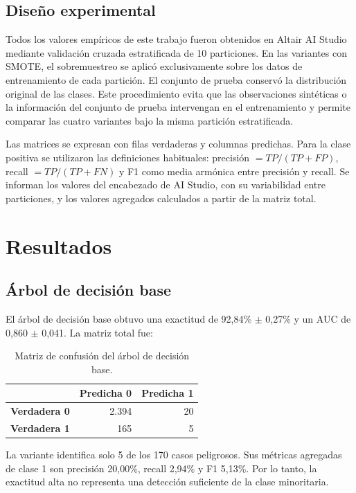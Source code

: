 \documentclass[12pt,a4paper]{article}
\begin{document}
\subsection{Diseño experimental}

Todos los valores empíricos de este trabajo fueron obtenidos en Altair AI Studio mediante validación cruzada estratificada de 10 particiones. En las variantes con SMOTE, el sobremuestreo se aplicó exclusivamente sobre los datos de entrenamiento de cada partición. El conjunto de prueba conservó la distribución original de las clases. Este procedimiento evita que las observaciones sintéticas o la información del conjunto de prueba intervengan en el entrenamiento y permite comparar las cuatro variantes bajo la misma partición estratificada.

Las matrices se expresan con filas verdaderas y columnas predichas. Para la clase positiva se utilizaron las definiciones habituales: precisión $=TP/(TP+FP)$, recall $=TP/(TP+FN)$ y F1 como media armónica entre precisión y recall. Se informan los valores del encabezado de AI Studio, con su variabilidad entre particiones, y los valores agregados calculados a partir de la matriz total.

\section{Resultados}

\subsection{Árbol de decisión base}

El árbol de decisión base obtuvo una exactitud de 92,84\% $\pm$ 0,27\% y un AUC de 0,860 $\pm$ 0,041. La matriz total fue:

\begin{table}[H]
    \centering
    \caption{Matriz de confusión del árbol de decisión base.}
    \label{tab:dt-base-matrix}
    \begin{tabular}{lrr}
        \toprule
        & \textbf{Predicha 0} & \textbf{Predicha 1} \\
        \midrule
        \textbf{Verdadera 0} & 2.394 & 20 \\
        \textbf{Verdadera 1} & 165 & 5 \\
        \bottomrule
    \end{tabular}
\end{table}

La variante identifica solo 5 de los 170 casos peligrosos. Sus métricas agregadas de clase 1 son precisión 20,00\%, recall 2,94\% y F1 5,13\%. Por lo tanto, la exactitud alta no representa una detección suficiente de la clase minoritaria.
\end{document}
